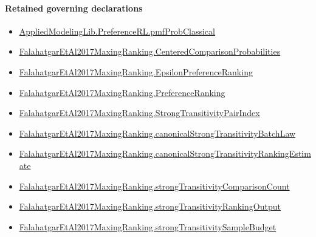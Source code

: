 \documentclass[10pt]{article}
\begin{document}
\paragraph{Retained governing declarations}
\begin{itemize}\raggedright
\item \hyperlink{governing-declaration-7adb8ad5ca0d515c}{Applied\allowbreak{}Modeling\allowbreak{}Lib.\allowbreak{}Preference\allowbreak{}RL.\allowbreak{}pmf\allowbreak{}Prob\allowbreak{}Classical}
\item \hyperlink{paper-prerequisite-b99b697ef57f53ce}{Falahatgar\allowbreak{}Et\allowbreak{}Al2017\allowbreak{}Maxing\allowbreak{}Ranking.\allowbreak{}Centered\allowbreak{}Comparison\allowbreak{}Probabilities}
\item \hyperlink{paper-prerequisite-4d3d96fb13998c50}{Falahatgar\allowbreak{}Et\allowbreak{}Al2017\allowbreak{}Maxing\allowbreak{}Ranking.\allowbreak{}Epsilon\allowbreak{}Preference\allowbreak{}Ranking}
\item \hyperlink{paper-prerequisite-b4c336afe891bbfe}{Falahatgar\allowbreak{}Et\allowbreak{}Al2017\allowbreak{}Maxing\allowbreak{}Ranking.\allowbreak{}Preference\allowbreak{}Ranking}
\item \hyperlink{governing-declaration-5c5e0bb1b8eb067f}{Falahatgar\allowbreak{}Et\allowbreak{}Al2017\allowbreak{}Maxing\allowbreak{}Ranking.\allowbreak{}Strong\allowbreak{}Transitivity\allowbreak{}Pair\allowbreak{}Index}
\item \hyperlink{governing-declaration-db28716ba79a819b}{Falahatgar\allowbreak{}Et\allowbreak{}Al2017\allowbreak{}Maxing\allowbreak{}Ranking.\allowbreak{}canonical\allowbreak{}Strong\allowbreak{}Transitivity\allowbreak{}Batch\allowbreak{}Law}
\item \hyperlink{paper-prerequisite-df9fc1df087145a6}{Falahatgar\allowbreak{}Et\allowbreak{}Al2017\allowbreak{}Maxing\allowbreak{}Ranking.\allowbreak{}canonical\allowbreak{}Strong\allowbreak{}Transitivity\allowbreak{}Ranking\allowbreak{}Estimate}
\item \hyperlink{governing-declaration-146a2e763f846540}{Falahatgar\allowbreak{}Et\allowbreak{}Al2017\allowbreak{}Maxing\allowbreak{}Ranking.\allowbreak{}strong\allowbreak{}Transitivity\allowbreak{}Comparison\allowbreak{}Count}
\item \hyperlink{paper-prerequisite-a4544018ef455b90}{Falahatgar\allowbreak{}Et\allowbreak{}Al2017\allowbreak{}Maxing\allowbreak{}Ranking.\allowbreak{}strong\allowbreak{}Transitivity\allowbreak{}Ranking\allowbreak{}Output}
\item \hyperlink{governing-declaration-4a0497dd706e9518}{Falahatgar\allowbreak{}Et\allowbreak{}Al2017\allowbreak{}Maxing\allowbreak{}Ranking.\allowbreak{}strong\allowbreak{}Transitivity\allowbreak{}Sample\allowbreak{}Budget}
\end{itemize}
\end{document}
